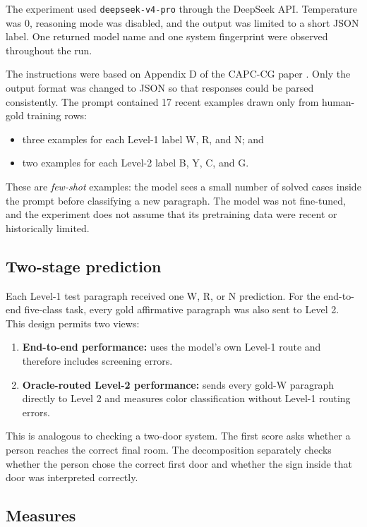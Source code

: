 \documentclass[11pt]{article}
\begin{document}
The experiment used \texttt{deepseek-v4-pro} through the DeepSeek API. Temperature was 0, reasoning mode was disabled, and the output was limited to a short JSON label. One returned model name and one system fingerprint were observed throughout the run.

The instructions were based on Appendix D of the CAPC-CG paper \cite{sun2026}. Only the output format was changed to JSON so that responses could be parsed consistently. The prompt contained 17 recent examples drawn only from human-gold training rows:

\begin{itemize}
    \item three examples for each Level-1 label W, R, and N; and
    \item two examples for each Level-2 label B, Y, C, and G.
\end{itemize}

These are \emph{few-shot} examples: the model sees a small number of solved cases inside the prompt before classifying a new paragraph. The model was not fine-tuned, and the experiment does not assume that its pretraining data were recent or historically limited.

\subsection{Two-stage prediction}

Each Level-1 test paragraph received one W, R, or N prediction. For the end-to-end five-class task, every gold affirmative paragraph was also sent to Level 2. This design permits two views:

\begin{enumerate}
    \item \textbf{End-to-end performance:} uses the model's own Level-1 route and therefore includes screening errors.
    \item \textbf{Oracle-routed Level-2 performance:} sends every gold-W paragraph directly to Level 2 and measures color classification without Level-1 routing errors.
\end{enumerate}

This is analogous to checking a two-door system. The first score asks whether a person reaches the correct final room. The decomposition separately checks whether the person chose the correct first door and whether the sign inside that door was interpreted correctly.

\subsection{Measures}
\end{document}
